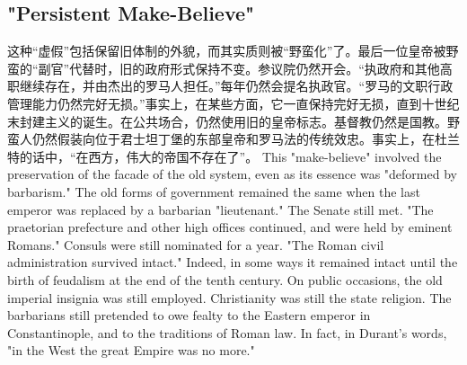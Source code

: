 \subsection{"Persistent Make-Believe"}
\begin{paracol}{2}
  这种“虚假”包括保留旧体制的外貌，而其实质则被“野蛮化”了。最后一位皇帝被野蛮的“副官”代替时，旧的政府形式保持不变。参议院仍然开会。“执政府和其他高职继续存在，并由杰出的罗马人担任。”每年仍然会提名执政官。“罗马的文职行政管理能力仍然完好无损。”事实上，在某些方面，它一直保持完好无损，直到十世纪末封建主义的诞生。在公共场合，仍然使用旧的皇帝标志。基督教仍然是国教。野蛮人仍然假装向位于君士坦丁堡的东部皇帝和罗马法的传统效忠。事实上，在杜兰特的话中，“在西方，伟大的帝国不存在了”。
  \switchcolumn
  This "make-believe" involved the preservation of the facade of the old system, even as its essence was "deformed by barbarism." The old forms of government remained the same when the last emperor was replaced by a barbarian "lieutenant." The Senate still met. "The praetorian prefecture and other high offices continued, and were held by eminent Romans." Consuls were still nominated for a year. "The Roman civil administration survived intact." Indeed, in some ways it remained intact until the birth of feudalism at the end of the tenth century. On public occasions, the old imperial insignia was still employed. Christianity was still the state religion. The barbarians still pretended to owe fealty to the Eastern emperor in Constantinople, and to the traditions of Roman law. In fact, in Durant's words, "in the West the great Empire was no more." 
\end{paracol}

  
